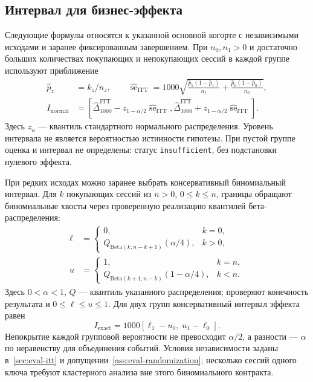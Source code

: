 \documentclass[12pt,a4paper]{article}
\theoremstyle{plainru}
\begin{document}
\subsection{Интервал для бизнес-эффекта}\label{sec:eval-itt-ci}

Следующие формулы относятся к указанной основной когорте с независимыми
исходами и заранее фиксированным завершением. При $n_0,n_1>0$ и
достаточно больших количествах покупающих и непокупающих сессий
в каждой группе используют приближение
\begin{align}
 \widehat p_z&=k_z/n_z,\qquad
 \widehat{\operatorname{se}}_{\mathrm{ITT}}
 =1000\sqrt{\frac{\widehat p_1(1-\widehat p_1)}{n_1}
              +\frac{\widehat p_0(1-\widehat p_0)}{n_0}},
 \label{eq:eval-itt-se}\\
 I_{\mathrm{normal}}
 &=\left[\widehat\Delta_{1000}^{\mathrm{ITT}}
       -z_{1-\alpha/2}\widehat{\operatorname{se}}_{\mathrm{ITT}},
         \widehat\Delta_{1000}^{\mathrm{ITT}}
       +z_{1-\alpha/2}\widehat{\operatorname{se}}_{\mathrm{ITT}}\right].
 \label{eq:eval-itt-normal-ci}
\end{align}
Здесь $z_u$ --- квантиль стандартного нормального распределения.
Уровень интервала не является вероятностью истинности гипотезы.
При пустой группе оценка и интервал не определены: статус
\texttt{insufficient}, без подстановки нулевого эффекта.

При редких исходах можно заранее выбрать консервативный биномиальный
интервал. Для $k$ покупающих сессий из $n>0$, $0\le k\le n$,
границы обращают биномиальные хвосты через проверенную реализацию
квантилей бета-распределения:
\begin{subequations}\label{eq:eval-exact-beta}
\begin{align}
\ell&=\begin{cases}
0,&k=0,\\
Q_{\mathrm{Beta}(k,n-k+1)}(\alpha/4),&k>0,
\end{cases}\label{eq:eval-exact-lower}\\
u&=\begin{cases}
1,&k=n,\\
Q_{\mathrm{Beta}(k+1,n-k)}(1-\alpha/4),&k<n.
\end{cases}\label{eq:eval-exact-upper}
\end{align}
\end{subequations}
Здесь $0<\alpha<1$, $Q$ --- квантиль указанного распределения;
проверяют конечность результата и $0\le\ell\le u\le1$.
Для двух групп консервативный интервал эффекта равен
\begin{equation}\label{eq:eval-exact-diff}
 I_{\mathrm{exact}}=1000[\ell_1-u_0,\;u_1-\ell_0].
\end{equation}
Непокрытие каждой групповой вероятности не превосходит $\alpha/2$,
а разности --- $\alpha$ по неравенству для объединения событий.
Условия независимости заданы в~\ref{sec:eval-itt}
и допущении~\ref{ass:eval-randomization}; несколько сессий одного ключа
требуют кластерного анализа вне этого биномиального контракта.
\end{document}
